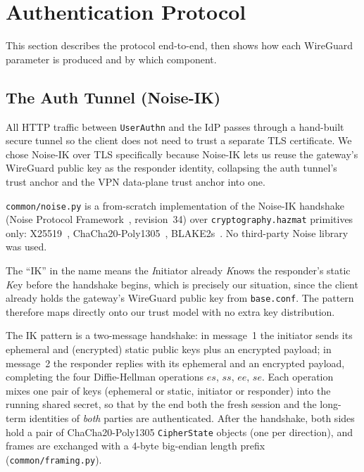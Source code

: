 \section{Authentication Protocol}
\label{sec:protocol}

This section describes the protocol end-to-end, then shows how each
WireGuard parameter is produced and by which component.

\subsection{The Auth Tunnel (Noise-IK)}
\label{sec:noise}
All HTTP traffic between \texttt{UserAuthn} and the IdP passes through a
hand-built secure tunnel so the client does not need to trust a separate
TLS certificate.
We chose Noise-IK over TLS specifically because Noise-IK lets us reuse the
gateway's WireGuard public key as the responder identity, collapsing the
auth tunnel's trust anchor and the VPN data-plane trust anchor into one.

\texttt{common/noise.py} is a from-scratch implementation of the Noise-IK
handshake (Noise Protocol Framework~\cite{perrin2018noise}, revision~34) over
\texttt{cryptography.hazmat} primitives only: X25519~\cite{x25519rfc},
ChaCha20-Poly1305~\cite{rfc8439}, BLAKE2s~\cite{blake2}.
No third-party Noise library was used.

The ``IK'' in the name means the \emph{I}nitiator already \emph{K}nows the
responder's static \emph{K}ey before the handshake begins, which is
precisely our situation, since the client already holds the gateway's
WireGuard public key from \texttt{base.conf}. The pattern therefore maps
directly onto our trust model with no extra key distribution.

The IK pattern is a two-message handshake: in message~1 the initiator sends
its ephemeral and (encrypted) static public keys plus an encrypted payload;
in message~2 the responder replies with its ephemeral and an encrypted
payload, completing the four Diffie-Hellman operations $es$, $ss$, $ee$,
$se$. Each operation mixes one pair of keys (ephemeral or static, initiator
or responder) into the running shared secret, so that by the end both the
fresh session and the long-term identities of \emph{both} parties are
authenticated.
After the handshake, both sides hold a pair of ChaCha20-Poly1305
\texttt{CipherState} objects (one per direction), and frames are exchanged
with a 4-byte big-endian length prefix (\texttt{common/framing.py}).

